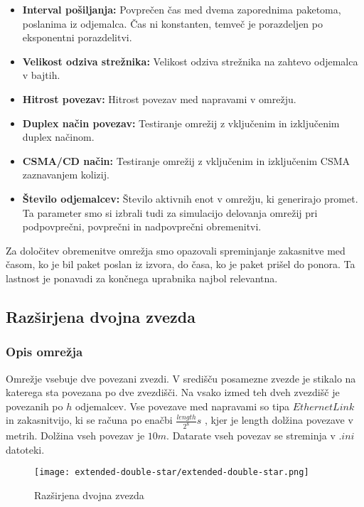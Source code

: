 \begin{itemize}
    \item \textbf{Interval pošiljanja:} Povprečen čas med dvema zaporednima paketoma, poslanima iz odjemalca. Čas ni konstanten, temveč je porazdeljen po eksponentni porazdelitvi.
    \item \textbf{Velikost odziva strežnika:} Velikost odziva strežnika na zahtevo odjemalca v bajtih. 
    \item \textbf{Hitrost povezav:} Hitrost povezav med napravami v omrežju.
    \item \textbf{Duplex način povezav:} Testiranje omrežij z vključenim in izključenim duplex načinom.
    \item \textbf{CSMA/CD način:} Testiranje omrežij z vključenim in izključenim CSMA zaznavanjem kolizij.
    \item \textbf{Število odjemalcev:} Število aktivnih enot v omrežju, ki generirajo promet. Ta parameter smo si izbrali tudi za simulacijo delovanja omrežij pri podpovprečni, povprečni in nadpovprečni obremenitvi.
\end{itemize}

Za določitev obremenitve omrežja smo opazovali spreminjanje zakasnitve med časom, ko je bil paket poslan iz izvora, do časa, ko je paket prišel do ponora. Ta lastnost je ponavadi za končnega uprabnika najbol relevantna.

\subsection{Razširjena dvojna zvezda}

\subsubsection{Opis omrežja}

Omrežje vsebuje dve povezani zvezdi. V središču posamezne zvezde je stikalo na katerega sta povezana po dve zvezdišči. Na vsako izmed teh dveh zvezdišč je povezanih po $h$ odjemalcev. Vse povezave med napravami so tipa $EthernetLink$ in zakasnitvijo, ki se računa po enačbi $\frac{length}{2^8}s$ \cite{omnetpp}, kjer je length dolžina povezave v metrih. Dolžina vseh povezav je $10m$. Datarate vseh povezav se streminja v $.ini$ datoteki.

\begin{figure}[H]
    \centering
    \texttt{[image: extended-double-star/extended-double-star.png]}
    \caption{Razširjena dvojna zvezda} 
    \label{fig:double-star}
\end{figure}

